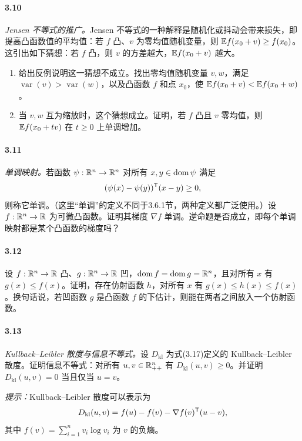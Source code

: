 \paragraph{3.10}\textit{Jensen 不等式的推广。}Jensen 不等式的一种解释是随机化或抖动会带来损失，即提高凸函数值的平均值：若 $f$ 凸、$v$ 为零均值随机变量，则 $\mathbb E f(x_0+v)\geq f(x_0)$。这引出如下猜想：若 $f$ 凸，则 $v$ 的方差越大，$\mathbb E f(x_0+v)$ 越大。
\begin{enumerate}[label=(\alph*)]
\item 给出反例说明这一猜想不成立。找出零均值随机变量 $v,w$，满足 $\operatorname{var}(v)>\operatorname{var}(w)$，以及凸函数 $f$ 和点 $x_0$，使 $\mathbb E f(x_0+v)<\mathbb E f(x_0+w)$。
\item 当 $v,w$ 互为缩放时，这个猜想成立。证明，若 $f$ 凸且 $v$ 零均值，则 $\mathbb E f(x_0+tv)$ 在 $t\geq0$ 上单调增加。
\end{enumerate}
\paragraph{3.11}\textit{单调映射。}若函数 $\psi:\mathbb R^n\to\mathbb R^n$ 对所有 $x,y\in\operatorname{dom}\psi$ 满足
\[(\psi(x)-\psi(y))^\mathsf T(x-y)\geq0,\]
则称它单调。（这里“单调”的定义不同于3.6.1节，两种定义都广泛使用。）设 $f:\mathbb R^n\to\mathbb R$ 为可微凸函数。证明其梯度 $\nabla f$ 单调。逆命题是否成立，即每个单调映射都是某个凸函数的梯度吗？
\paragraph{3.12}设 $f:\mathbb R^n\to\mathbb R$ 凸、$g:\mathbb R^n\to\mathbb R$ 凹，$\operatorname{dom} f=\operatorname{dom} g=\mathbb R^n$，且对所有 $x$ 有 $g(x)\leq f(x)$。证明，存在仿射函数 $h$，对所有 $x$ 有 $g(x)\leq h(x)\leq f(x)$。换句话说，若凹函数 $g$ 是凸函数 $f$ 的下估计，则能在两者之间放入一个仿射函数。
\paragraph{3.13}\textit{Kullback--Leibler 散度与信息不等式。}设 $D_{\mathrm{kl}}$ 为式(3.17)定义的 Kullback--Leibler 散度。证明信息不等式：对所有 $u,v\in\mathbb R_{++}^n$ 有 $D_{\mathrm{kl}}(u,v)\geq0$。并证明 $D_{\mathrm{kl}}(u,v)=0$ 当且仅当 $u=v$。

\textit{提示：}Kullback--Leibler 散度可以表示为
\[D_{\mathrm{kl}}(u,v)=f(u)-f(v)-\nabla f(v)^\mathsf T(u-v),\]
其中 $f(v)=\sum_{i=1}^n v_i\log v_i$ 为 $v$ 的负熵。
